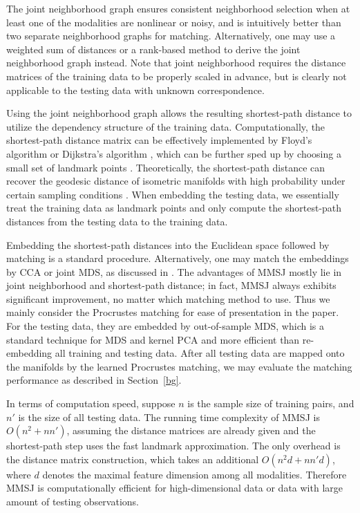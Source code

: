 \documentclass[times,twocolumn,final]{elsarticle}
\begin{document}
The joint neighborhood graph ensures consistent neighborhood selection when at least one of the modalities are nonlinear or noisy, and is intuitively better than two separate neighborhood graphs for matching. Alternatively, one may use a weighted sum of distances or a rank-based method to derive the joint neighborhood graph instead. Note that joint neighborhood requires the distance matrices of the training data to be properly scaled in advance, but is clearly not applicable to the testing data with unknown correspondence.

Using the joint neighborhood graph allows the resulting shortest-path distance to utilize the dependency structure of the training data. Computationally, the shortest-path distance matrix can be effectively implemented by Floyd's algorithm or Dijkstra's algorithm \citep{TenenbaumSilvaLangford2000}, which can be further sped up by choosing a small set of landmark points \citep{SilvaTenenbaum2003, BengioEtal2003}. Theoretically, the shortest-path distance can recover the geodesic distance of isometric manifolds with high probability under certain sampling conditions \citep{BernsteinEtAl2000, SilvaTenenbaum2003}. When embedding the testing data, we essentially treat the training data as landmark points and only compute the shortest-path distances from the testing data to the training data.

Embedding the shortest-path distances into the Euclidean space followed by matching is a standard procedure. Alternatively, one may match the embeddings by CCA or joint MDS, as discussed in \citep{PriebeMarchette2012, FishkindShenPriebe2016}. The advantages of MMSJ mostly lie in joint neighborhood and shortest-path distance; in fact, MMSJ always exhibits significant improvement, no matter which matching method to use. Thus we mainly consider the Procrustes matching for ease of presentation in the paper. For the testing data, they are embedded by out-of-sample MDS, which is a standard technique for MDS and kernel PCA \citep{ScholkopfSmolaMuller1998,BengioEtal2003,TrossetPriebe2008} and more efficient than re-embedding all training and testing data. After all testing data are mapped onto the manifolds by the learned Procrustes matching, we may evaluate the matching performance as described in Section~\ref{bg}.

In terms of computation speed, suppose $n$ is the sample size of training pairs, and $n'$ is the size of all testing data. The running time complexity of MMSJ is $O(n^2+ n n')$, assuming the distance matrices are already given and the shortest-path step uses the fast landmark approximation. The only overhead is the distance matrix construction, which takes an additional $O(n^2 d+ nn' d)$, where $d$ denotes the maximal feature dimension among all modalities. Therefore MMSJ is computationally efficient for high-dimensional data or data with large amount of testing observations.
\end{document}
